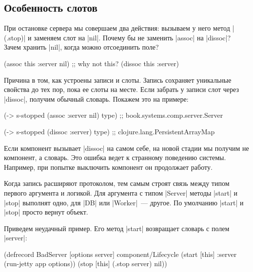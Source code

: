\subsection{Особенность слотов}

При остановке сервера мы совершаем два действия: вызываем у него метод
\spverb|(.stop)| и заменяем слот на \spverb|nil|. Почему бы не заменить
\spverb|assoc| на \spverb|dissoc|? Зачем хранить \spverb|nil|, когда можно
отсоединить поле?

\begin{english}
  \begin{clojure}
(assoc this :server nil)
;; why not this?
(dissoc this :server)
  \end{clojure}
\end{english}

Причина в том, как устроены записи и слоты. Запись сохраняет уникальные свойства
до тех пор, пока ее слоты на месте. Если забрать у записи слот через
\spverb|dissoc|, получим обычный словарь. Покажем это на примере:

\begin{english}
  \begin{clojure}
(-> s-stopped (assoc :server nil) type)
;; book.systems.comp.server.Server

(-> s-stopped (dissoc :server) type)
;; clojure.lang.PersistentArrayMap
  \end{clojure}
\end{english}

Если компонент вызывает \spverb|dissoc| на самом себе, на новой стадии мы
получим не компонент, а словарь. Это ошибка ведет к странному поведению
системы. Например, при попытке выключить компонент он продолжает работу.

Когда запись расширяют протоколом, тем самым строят связь между типом первого
аргумента и логикой. Для аргумента с типом \spverb|Server| методы \spverb|start|
и \spverb|stop| выполнят одно, для \spverb|DB| или \spverb|Worker|~---
другое. По умолчанию \spverb|start| и \spverb|stop| просто вернут объект.

Приведем неудачный пример. Его метод \spverb|start| возвращает словарь с полем
\spverb|server|:

\begin{english}
  \begin{clojure}
(defrecord BadServer [options server]
  component/Lifecycle
  (start [this]
    {:server (run-jetty app options)})
  (stop [this]
    (.stop server)
    nil))
  \end{clojure}
\end{english}

